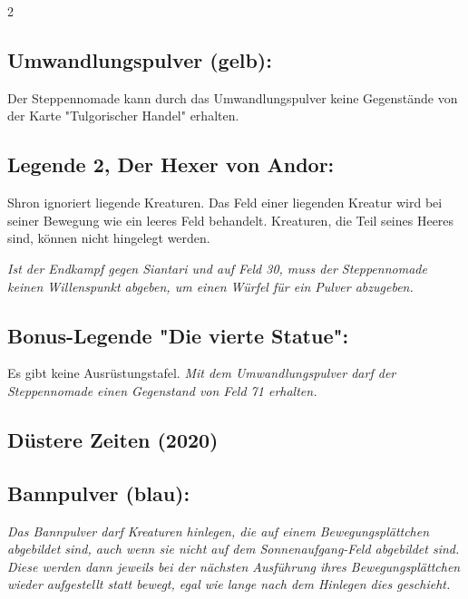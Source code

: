 \documentclass[10pt, a4paper, oneside]{book}
\newcommand{\fan}[1]{\textit{#1}}
\begin{document}
\begin{multicols*}{2}
\begin{bgcolor}[color-ag]
\subsection{Umwandlungspulver (gelb):}

Der Steppennomade kann durch das Umwandlungspulver keine Gegenstände von der Karte "Tulgorischer Handel" erhalten.
\supercite{88659}



\subsection{Legende 2, Der Hexer von Andor:}

Shron ignoriert liegende Kreaturen. Das Feld einer liegenden Kreatur wird bei seiner Bewegung wie ein leeres Feld behandelt. Kreaturen, die Teil seines Heeres sind, können nicht hingelegt werden.
\supercite{ag-begleitheft}

\fan{Ist der Endkampf gegen Siantari und auf Feld 30, muss der Steppennomade keinen Willenspunkt abgeben, um einen Würfel für ein Pulver abzugeben.}



\subsection{Bonus-Legende "Die vierte Statue":}

Es gibt keine Ausrüstungstafel. \fan{Mit dem Umwandlungspulver darf der Steppennomade einen Gegenstand von Feld 71 erhalten.}

\end{bgcolor}





\columnbreak


\begin{bgcolor}[color-dz]
\section{Düstere Zeiten (2020)}

\subsection{Bannpulver (blau):}

\fan{Das Bannpulver darf Kreaturen hinlegen, die auf einem Bewegungsplättchen abgebildet sind, auch wenn sie nicht auf dem Sonnenaufgang-Feld abgebildet sind. Diese werden dann jeweils bei der nächsten Ausführung ihres Bewegungsplättchen wieder aufgestellt statt bewegt, egal wie lange nach dem Hinlegen dies geschieht. }


\end{bgcolor}
\end{multicols*}
\end{document}
